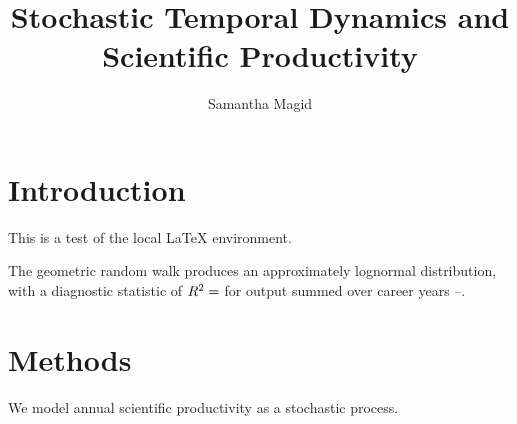 \documentclass[11pt]{article}
\title{Stochastic Temporal Dynamics and Scientific Productivity}
\author{Samantha Magid}
\date{}
\begin{document}
\maketitle

\section{Introduction}

This is a test of the local LaTeX environment.

The geometric random walk produces an approximately
lognormal distribution, with a diagnostic statistic
of $R^2 = \GRWQQRtwo$ for output summed over career years
\DBLPFourYearStart--\DBLPFourYearEnd.

\section{Methods}

We model annual scientific productivity as a stochastic process.
\end{document}
